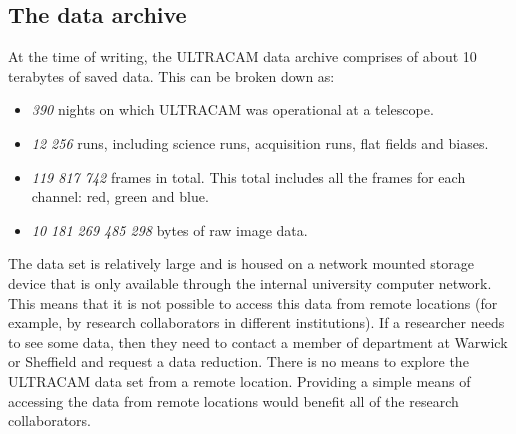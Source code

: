 \subsection{The data archive}
At the time of writing, the ULTRACAM data archive comprises of about 10 terabytes of saved data. This can be broken down as:
\begin{itemize}
	\item \emph{390} nights on which ULTRACAM was operational at a telescope.
	\item \emph{12 256} runs, including science runs, acquisition runs, flat fields and biases. 
	\item \emph{119 817 742} frames in total. This total includes all the frames for each channel: red, green and blue.
	\item \emph{10 181 269 485 298} bytes of raw image data.
\end{itemize} 

The data set is relatively large and is housed on a network mounted storage device that is only available through the internal university computer network. This means that it is not possible to access this data from remote locations (for example, by research collaborators in different institutions). If a researcher needs to see some data, then they need to contact a member of department at Warwick or Sheffield and request a data reduction. There is no means to explore the ULTRACAM data set from a remote location. Providing a simple means of accessing the data from remote locations would benefit all of the research collaborators. 


